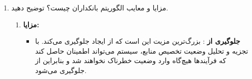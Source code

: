 \begin{enumerate}
	
	\item 
	مزایا و معایب الگوریتم بانکداران چیست؟ توضیح دهید.
	\begin{qsolve}
		\begin{enumerate}
			\item \textbf{مزایا: }
			\begin{itemize}
				\item \textbf{جلوگیری از }: بزرگ‌ترین مزیت  این است که از ایجاد  جلوگیری می‌کند. با تجزیه و تحلیل وضعیت تخصیص منابع، سیستم می‌تواند اطمینان حاصل کند که فرآیندها هیچ‌گاه وارد وضعیت خطرناک نخواهند شد و بنابراین از  جلوگیری می‌شود.
			\end{itemize}
		\end{enumerate}
	\end{qsolve}
\end{enumerate}
\newpage



